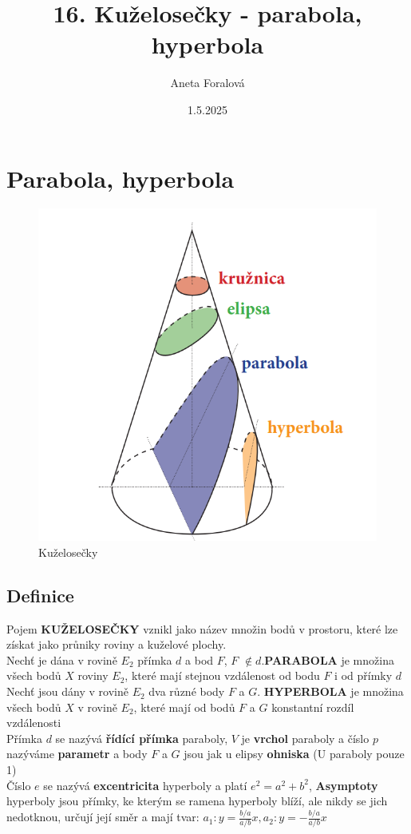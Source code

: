 \title{ 16. Kuželosečky - parabola, hyperbola}
\author{Aneta Foralová}
\date{1.5.2025}

\maketitle

\section{Parabola, hyperbola}


\begin{figure}[H]
        \centering
        \includegraphics[width=0.3\linewidth]{img/14_kuzelosecky.png}
        \caption{Kuželosečky} 
        \label{fig:enter-label}
    \end{figure}   
    

\subsection{Definice}
    Pojem \textbf{KUŽELOSEČKY} vznikl jako název množin bodů v prostoru, které lze získat jako průniky roviny a kuželové plochy.\\
    
    Nechť je dána v rovině $E_2$ přímka $d$ a bod $F$, $F$ $\notin d$.\textbf{PARABOLA} je množina všech bodů $X$ roviny $E_2$, které mají stejnou vzdálenost od bodu $F$ i od přímky $d$\\
    
    Nechť jsou dány v rovině $E_2$ dva různé body $F$ a $G$. \textbf{HYPERBOLA} je množina všech bodů $X$ v rovině $E_2$, které mají od bodů $F$ a $G$ konstantní rozdíl vzdálenosti\\
    
    Přímka $d$ se nazývá \textbf{řídící přímka} paraboly, $V$ je \textbf{vrchol} paraboly a číslo $p$ nazýváme \textbf{parametr} a body $F$ a $G$ jsou jak u elipsy \textbf{ohniska} (U paraboly pouze 1)\\
    
    Číslo $e$ se nazývá \textbf{excentricita }hyperboly a platí $e^2=a^2 + b^2$, \textbf{Asymptoty} hyperboly jsou přímky, ke kterým se ramena hyperboly blíží, ale nikdy se jich nedotknou, určují její směr a mají tvar: $a_1: y=\frac{b/a}{a/b}x,a_2: y=-\frac{b/a}{a/b}x$
    
